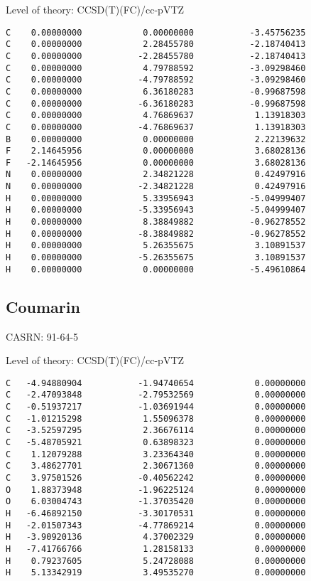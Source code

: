 \documentclass[journal=jctcce,manuscript=article,layout=traditional]{achemso}
\newcommand{\TZ}{cc-pVTZ}
\begin{document}
\begin{singlespace}
\noindent  Level of theory: CCSD(T)(FC)/{\TZ}
\begin{verbatim}
C    0.00000000            0.00000000           -3.45756235
C    0.00000000            2.28455780           -2.18740413
C    0.00000000           -2.28455780           -2.18740413
C    0.00000000            4.79788592           -3.09298460
C    0.00000000           -4.79788592           -3.09298460
C    0.00000000            6.36180283           -0.99687598
C    0.00000000           -6.36180283           -0.99687598
C    0.00000000            4.76869637            1.13918303
C    0.00000000           -4.76869637            1.13918303
B    0.00000000            0.00000000            2.22139632
F    2.14645956            0.00000000            3.68028136
F   -2.14645956            0.00000000            3.68028136
N    0.00000000            2.34821228            0.42497916
N    0.00000000           -2.34821228            0.42497916
H    0.00000000            5.33956943           -5.04999407
H    0.00000000           -5.33956943           -5.04999407
H    0.00000000            8.38849882           -0.96278552
H    0.00000000           -8.38849882           -0.96278552
H    0.00000000            5.26355675            3.10891537
H    0.00000000           -5.26355675            3.10891537
H    0.00000000            0.00000000           -5.49610864
\end{verbatim}
\end{singlespace}

\subsection{Coumarin}

CASRN: 91-64-5 

\begin{singlespace}
\noindent Level of theory: CCSD(T)(FC)/{\TZ}
\begin{verbatim}
C   -4.94880904           -1.94740654            0.00000000
C   -2.47093848           -2.79532569            0.00000000
C   -0.51937217           -1.03691944            0.00000000
C   -1.01215298            1.55096378            0.00000000
C   -3.52597295            2.36676114            0.00000000
C   -5.48705921            0.63898323            0.00000000
C    1.12079288            3.23364340            0.00000000
C    3.48627701            2.30671360            0.00000000
C    3.97501526           -0.40562242            0.00000000
O    1.88373948           -1.96225124            0.00000000 
O    6.03004743           -1.37035420            0.00000000 
H   -6.46892150           -3.30170531            0.00000000
H   -2.01507343           -4.77869214            0.00000000
H   -3.90920136            4.37002329            0.00000000
H   -7.41766766            1.28158133            0.00000000
H    0.79237605            5.24728088            0.00000000
H    5.13342919            3.49535270            0.00000000
\end{verbatim}
\end{singlespace}
\end{document}
